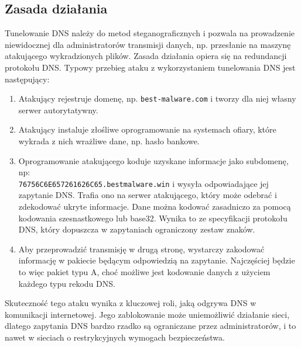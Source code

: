 \documentclass{eiti-raport}
\begin{document}
\subsection{Zasada działania} \label{sec:tunelowanie}
Tunelowanie DNS należy do metod steganograficznych i pozwala na prowadzenie niewidocznej dla administratorów transmisji danych, np. przesłanie na maszynę atakującego wykradzionych plików. Zasada działania opiera się na redundancji protokołu DNS. Typowy przebieg ataku z wykorzystaniem tunelowania DNS jest następujący:
\begin{enumerate}
	\item Atakujący rejestruje domenę, np. \texttt{best-malware.com} i tworzy dla niej własny serwer autorytatywny. 
	\item Atakujący instaluje złośliwe oprogramowanie na systemach ofiary, które wykrada z nich wrażliwe dane, np. hasło bankowe. 
	\item Oprogramowanie atakującego koduje uzyskane informacje jako subdomenę, np: \\  \texttt{76756C6E657261626C65.bestmalware.win} i wysyła odpowiadające jej zapytanie DNS. Trafia ono na serwer atakującego, który może odebrać i zdekodować ukryte informacje. Dane można kodować zasadniczo za pomocą kodowania szesnastkowego lub base32. Wynika to ze specyfikacji protokołu DNS, który dopuszcza w zapytaniach ograniczony zestaw znaków. 
	\item Aby przeprowadzić transmisję w drugą stronę, wystarczy zakodować informację w pakiecie będącym odpowiedzią na zapytanie. Najczęściej będzie to więc pakiet typu A, choć możliwe jest kodowanie danych z użyciem każdego typu rekodu DNS. 
\end{enumerate}
Skuteczność tego ataku wynika z kluczowej roli, jaką odgrywa DNS w komunikacji internetowej. Jego zablokowanie może uniemożliwić działanie sieci, dlatego zapytania DNS bardzo rzadko są ograniczane przez administratorów, i to nawet w sieciach o restrykcyjnych wymogach bezpieczeństwa. 
\end{document}
